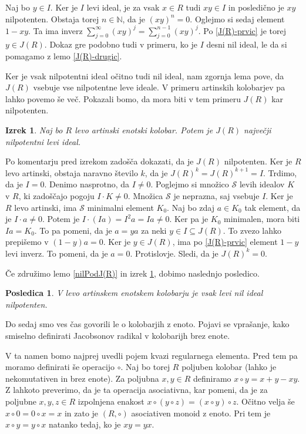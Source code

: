\documentclass[a4paper, 12pt]{amsart}
\theoremstyle{definition} %
\theoremstyle{plain} %
\newtheorem{izrek}[definicija]{Izrek}
\newtheorem{posledica}[definicija]{Posledica}
\newcommand{\N}{\mathbb N}
\begin{document}
\proof
Naj bo $y\in I$. Ker je $I$ levi ideal, je za vsak $x\in R$ tudi $xy \in I$ in posledično je $xy$ nilpotenten. Obstaja torej $n\in \N$, da je $(xy)^n = 0$. Oglejmo si sedaj element $1-xy$. Ta ima inverz $\sum_{j=0}^{\infty} (xy)^j = \sum_{j=0}^{n-1} (xy)^j$. Po \ref{J(R)-prvic} je torej $y \in J(R)$. Dokaz gre podobno tudi v primeru, ko je $I$ desni nil ideal, le da si pomagamo z lemo \ref{J(R)-drugic}.
\endproof

Ker je vsak nilpotentni ideal očitno tudi nil ideal, nam zgornja lema pove, da $J(R)$ vsebuje vse nilpotentne leve ideale. V primeru artinskih kolobarjev pa lahko povemo še več. Pokazali bomo, da mora biti v tem primeru $J(R)$ kar nilpotenten.

\begin{izrek}
\label{J(R)nilpotenten-levoArtinski}
Naj bo $R$ levo artinski enotski kolobar. Potem je $J(R)$ največji nilpotentni levi ideal.
\end{izrek}

\proof
Po komentarju pred izrekom zadošča dokazati, da je $J(R)$ nilpotenten. Ker je $R$ levo artinski, obstaja naravno število $k$, da je $J(R)^k = J(R) ^{k+1} = I$. Trdimo, da je $I=0$. Denimo nasprotno, da $I\neq 0$. Poglejmo si množico $\mathcal{S}$ levih idealov $K$ v $R$, ki zadoščajo pogoju $I\cdot K \neq 0$. Množica $\mathcal{S}$ je neprazna, saj vsebuje $I$. Ker je $R$ levo artinski, ima $\mathcal{S}$ minimalni element $K_0$. Naj bo zdaj $a\in K_0$ tak element, da je $I\cdot a \neq 0$. Potem je $I\cdot (Ia) = I^2 a = Ia \neq 0$. Ker pa je $K_0$ minimalen, mora biti $Ia = K_0$. To pa pomeni, da je $a = ya$ za neki $y\in I \subseteq J(R)$. To zvezo lahko prepišemo v $(1-y)a = 0$. Ker je $y\in J(R)$, ima po \ref{J(R)-prvic} element $1-y$ levi inverz. To pomeni, da je $a=0$. Protislovje. Sledi, da je $J(R)^k = 0$.
\endproof

Če združimo lemo \ref{nilPodJ(R)} in izrek \ref{J(R)nilpotenten-levoArtinski}, dobimo naslednjo posledico.

\begin{posledica}
V levo artinskem enotskem kolobarju je vsak levi nil ideal nilpotenten.
\end{posledica}

Do sedaj smo ves čas govorili le o kolobarjih z enoto. Pojavi se vprašanje, kako smiselno definirati Jacobsonov radikal v kolobarijh brez enote. 

V ta namen bomo najprej uvedli pojem kvazi regularnega elementa. Pred tem pa moramo definirati še operacijo $\circ$. Naj bo torej $R$ poljuben kolobar (lahko je nekomutativen in brez enote). Za poljubna $x,y\in R$ definiramo $x\circ y = x+y-xy$. Z lahkoto preverimo, da je ta operacija asociativna, kar pomeni, da je za poljubne $x,y,z\in R$ izpolnjena enakost $x\circ(y\circ z) = (x\circ y) \circ z$. Očitno velja še $x \circ 0 = 0 \circ x = x$ in zato je $(R,\circ )$ asociativen monoid z enoto. Pri tem je $x\circ y = y\circ x$ natanko tedaj, ko je $xy = yx$.
\end{document}
